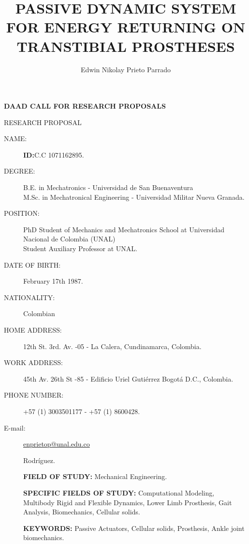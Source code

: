 \documentclass[12pt,english]{article}
\begin{document}
\title{PASSIVE DYNAMIC SYSTEM FOR ENERGY RETURNING ON TRANSTIBIAL PROSTHESES}
\maketitle
\begin{center}
 \textbf{{\large DAAD CALL FOR RESEARCH PROPOSALS}}
\par\end{center}

\begin{center}
RESEARCH PROPOSAL 
\par\end{center}

\begin{description}
\item [{NAME:}] \author{Edwin Nikolay Prieto Parrado} \textbf{ID:}C.C 1071162895.
\item [{DEGREE:}] B.E. in Mechatronics - Universidad de San Buenaventura \\ M.Sc. in Mechatronical Engineering - Universidad Militar Nueva Granada.
\item[{POSITION: }] PhD Student of Mechanics and Mechatronics School at Universidad Nacional de Colombia (UNAL) \\ Student Auxiliary Professor at UNAL.
\item[{DATE OF BIRTH: }] February 17th 1987.
\item[{NATIONALITY: }] Colombian
\item[{HOME ADDRESS: }] 12th St. 3rd. Av. -05 - La Calera, Cundinamarca, Colombia.
\item[{WORK ADDRESS: }] 45th Av. 26th St -85 - Edificio Uriel Gutiérrez
Bogotá D.C.,  Colombia.
\item[{PHONE NUMBER: }] +57 (1) 3003501177 - +57 (1) 8600428.
\item[{E-mail: }] \href{mailto:enprietop@unal.edu.co}{  enprietop@unal.edu.co}


Rodríguez.

\textbf{FIELD OF STUDY: } Mechanical Engineering.

\textbf{SPECIFIC FIELDS OF STUDY:} Computational Modeling, Multibody Rigid and Flexible Dynamics, Lower Limb Prosthesis, Gait Analysis, Biomechanics, Cellular solids.

\textbf{KEYWORDS:} Passive Actuators, Cellular solids, Prosthesis, Ankle joint biomechanics.


\end{description}
\newpage
\renewcommand*\contentsname{Summary}
\tableofcontents
\newpage
\end{document}
